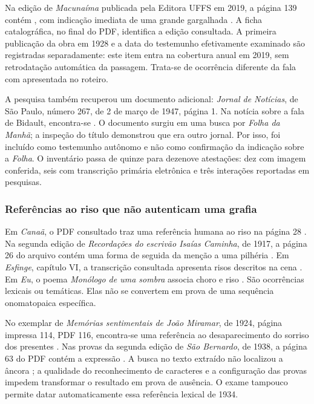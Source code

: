 Na edição de \textit{Macunaíma} publicada pela Editora UFFS em 2019, a página 139 contém , com indicação imediata de uma grande gargalhada \cite{andrade2019}. A ficha catalográfica, no final do PDF, identifica a edição consultada. A primeira publicação da obra em 1928 e a data do testemunho efetivamente examinado são registradas separadamente: este item entra na cobertura anual em 2019, sem retrodatação automática da passagem. Trata-se de ocorrência diferente da fala com  apresentada no roteiro.

A pesquisa também recuperou um documento adicional: \textit{Jornal de Notícias}, de São Paulo, número 267, de 2 de março de 1947, página 1. Na notícia sobre a fala de Bidault, encontra-se  \cite{jornalnoticias1947}. O documento surgiu em uma busca por \textit{Folha da Manhã}; a inspeção do título demonstrou que era outro jornal. Por isso, foi incluído como testemunho autônomo e não como confirmação da indicação sobre a \textit{Folha}. O inventário passa de quinze para dezenove atestações: dez com imagem conferida, seis com transcrição primária eletrônica e três interações reportadas em pesquisas.

\subsubsection{Referências ao riso que não autenticam uma grafia}
Em \textit{Canaã}, o PDF consultado traz uma referência humana ao riso na página 28 \cite{r2canaa}. Na segunda edição de \textit{Recordações do escrivão Isaías Caminha}, de 1917, a página 26 do arquivo contém uma forma de  seguida da menção a uma pilhéria \cite{r2isaias}. Em \textit{Esfinge}, capítulo VI, a transcrição consultada apresenta risos descritos na cena \cite{r2esfinge}. Em \textit{Eu}, o poema \textit{Monólogo de uma sombra} associa choro e riso \cite{r2eu}. São ocorrências lexicais ou temáticas. Elas não se convertem em prova de uma sequência onomatopaica específica.

No exemplar de \textit{Memórias sentimentais de João Miramar}, de 1924, página impressa 114, PDF 116, encontra-se uma referência ao desaparecimento do sorriso dos presentes \cite{r2miramar}. Nas provas da segunda edição de \textit{São Bernardo}, de 1938, a página 63 do PDF contém a expressão  \cite{r2saobernardo}. A busca no texto extraído não localizou a âncora ; a qualidade do reconhecimento de caracteres e a configuração das provas impedem transformar o resultado em prova de ausência. O exame tampouco permite datar automaticamente essa referência lexical de 1934.

